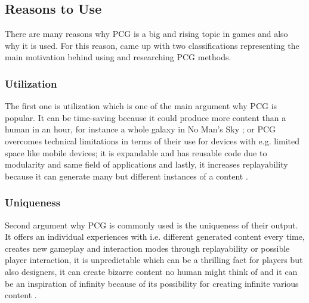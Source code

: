 \documentclass[MGS,Master,english]{twbook}%
\begin{document}
\subsection{Reasons to Use}
There are many reasons why PCG is a big and rising topic in games and also why it is used. For this reason, \cite{pcg::inGameDesign} came up with two classifications representing the main motivation behind using and researching PCG methods.

\subsubsection{Utilization}
The first one is utilization which is one of the main argument why PCG is popular. It can be time-saving because it could produce more content than a human in an hour, for instance a whole galaxy in No Man's Sky \cite{game::noMansSky}; or PCG overcomes technical limitations in terms of their use for devices with e.g. limited space like mobile devices; it is expandable and has reusable code due to modularity and same field of applications and lastly, it increases replayability because it can generate many but different instances of a content \cite{pcg::inGameDesign}.

\subsubsection{Uniqueness}
Second argument why PCG is commonly used is the uniqueness of their output. It offers an individual experiences with i.e. different generated content every time, creates new gameplay and interaction modes through replayability or possible player interaction, it is unpredictable which can be a thrilling fact for players but also designers, it can create bizarre content no human might think of and it can be an inspiration of infinity because of its possibility for creating infinite various content \cite{pcg::inGameDesign}.
\end{document}
